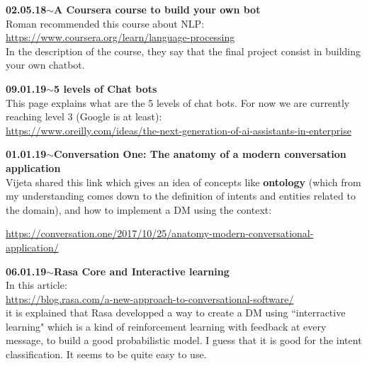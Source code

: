 \documentclass[11pt,a4paper]{article}
\newenvironment{loggentry}[2]%
{\noindent\textbf{#1}\hspace{1cm}$\mathbf{\sim}$\text{ }\textbf{#2}\\}{\vspace{0.5cm}}
\begin{document}
\begin{loggentry}{02.05.18}{A Coursera course to build your own bot}
Roman recommended this course about NLP:\\
\url{https://www.coursera.org/learn/language-processing}\\
In the description of the course, they say that the final project consist in building your own chatbot.
\end{loggentry}

\begin{loggentry}{09.01.19}{5 levels of Chat bots}

This page explains what are the 5 levels of chat bots. For now we are currently reaching level 3 (Google is at least):\\
\url{https://www.oreilly.com/ideas/the-next-generation-of-ai-assistants-in-enterprise}\\

\end{loggentry}

\begin{loggentry}{01.01.19}{Conversation One: The anatomy of a modern conversation application}

Vijeta shared this link which gives an idea of concepts like \textbf{ontology} (which from my understanding comes down to the definition of intents and entities related to the domain), and how to implement a DM using the context:

\url{https://conversation.one/2017/10/25/anatomy-modern-conversational-application/}

\end{loggentry}


\begin{loggentry}{06.01.19}{Rasa Core and Interactive learning}

In this article:\\
\url{https://blog.rasa.com/a-new-approach-to-conversational-software/}\\
it is explained that Rasa developped a way to create a DM using ``interractive learning" which is a kind of reinforcement learning with feedback at every message, to build a good probabilistic model. I guess that it is good for the intent classification. It seems to be quite easy to use.

\end{loggentry}
\end{document}
